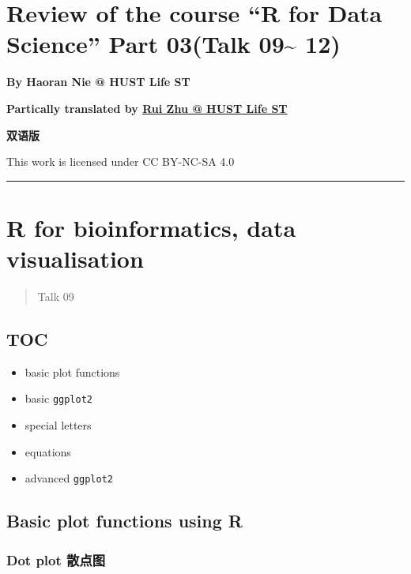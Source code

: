 \documentclass[
]{article}
\author{}
\date{}
\begin{document}
\hypertarget{review-of-the-course-r-for-data-science-part-03talk-09-12}{%
\section{Review of the course ``R for Data Science'' Part 03(Talk
09\textasciitilde{}
12)}\label{review-of-the-course-r-for-data-science-part-03talk-09-12}}

\textbf{By Haoran Nie @ HUST Life ST}

\textbf{Partically translated by
\href{https://github.com/1508324011}{Rui Zhu @ HUST Life ST}}

\textbf{双语版}

This work is licensed under CC BY-NC-SA 4.0

\begin{center}\rule{0.5\linewidth}{0.5pt}\end{center}

\hypertarget{r-for-bioinformatics-data-visualisation}{%
\section{R for bioinformatics, data
visualisation}\label{r-for-bioinformatics-data-visualisation}}

\begin{quote}
Talk 09
\end{quote}

\hypertarget{toc}{%
\subsection{TOC}\label{toc}}

\begin{itemize}
\item
  basic plot functions
\item
  basic \texttt{ggplot2}
\item
  special letters
\item
  equations
\item
  advanced \texttt{ggplot2}
\end{itemize}

\hypertarget{basic-plot-functions-using-r}{%
\subsection{Basic plot functions using
R}\label{basic-plot-functions-using-r}}

\hypertarget{dot-plot-ux6563ux70b9ux56fe}{%
\subsubsection{Dot plot 散点图}\label{dot-plot-ux6563ux70b9ux56fe}}
\end{document}
